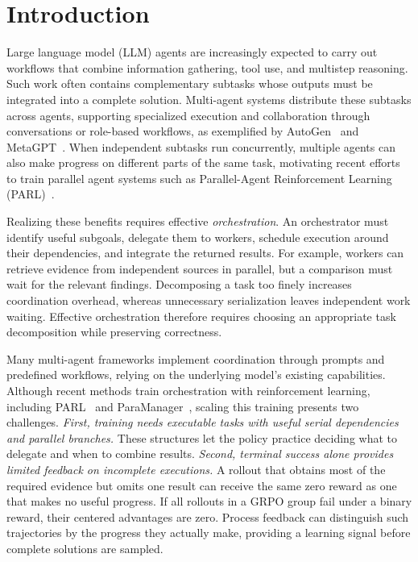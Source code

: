 \section{Introduction}
\label{sec:introduction}

Large language model (LLM) agents are increasingly expected to carry out workflows that combine information gathering, tool use, and multistep reasoning. Such work often contains complementary subtasks whose outputs must be integrated into a complete solution. Multi-agent systems distribute these subtasks across agents, supporting specialized execution and collaboration through conversations or role-based workflows, as exemplified by AutoGen~\citep{wu2023autogen} and MetaGPT~\citep{hong2023metagpt}. When independent subtasks run concurrently, multiple agents can also make progress on different parts of the same task, motivating recent efforts to train parallel agent systems such as Parallel-Agent Reinforcement Learning (PARL)~\citep{kimiteam2026kimik25}.

Realizing these benefits requires effective \emph{orchestration}. An orchestrator must identify useful subgoals, delegate them to workers, schedule execution around their dependencies, and integrate the returned results. For example, workers can retrieve evidence from independent sources in parallel, but a comparison must wait for the relevant findings. Decomposing a task too finely increases coordination overhead, whereas unnecessary serialization leaves independent work waiting. Effective orchestration therefore requires choosing an appropriate task decomposition while preserving correctness.

Many multi-agent frameworks implement coordination through prompts and predefined workflows, relying on the underlying model's existing capabilities. Although recent methods train orchestration with reinforcement learning, including PARL~\citep{kimiteam2026kimik25} and ParaManager~\citep{yuan2026paramanager}, scaling this training presents two challenges. \emph{First, training needs executable tasks with useful serial dependencies and parallel branches.} These structures let the policy practice deciding what to delegate and when to combine results. \emph{Second, terminal success alone provides limited feedback on incomplete executions.} A rollout that obtains most of the required evidence but omits one result can receive the same zero reward as one that makes no useful progress. If all rollouts in a GRPO group fail under a binary reward, their centered advantages are zero. Process feedback can distinguish such trajectories by the progress they actually make, providing a learning signal before complete solutions are sampled.

